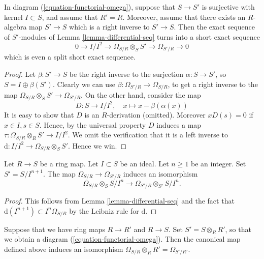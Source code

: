 \begin{lemma}
\label{lemma-differential-seq-split}
In diagram (\ref{equation-functorial-omega}),
suppose that $S \to S'$ is surjective with kernel $I \subset S$,
and assume that $R' = R$. Moreover, assume that there exists
an $R$-algebra map $S' \to S$ which is a right inverse to
$S' \to S$. Then the exact sequence of $S'$-modules
of Lemma \ref{lemma-differential-seq} turns into a short exact sequence
$$
0 \longrightarrow
I/I^2
\longrightarrow
\Omega_{S/R}\otimes_S S'
\longrightarrow
\Omega_{S'/R}
\longrightarrow
0
$$
which is even a split short exact sequence.
\end{lemma}

\begin{proof}
Let $\beta : S' \to S$ be the right inverse to the surjection
$\alpha : S \to S'$, so $S = I \oplus \beta(S')$.
Clearly we can use $\beta : \Omega_{S'/R} \to \Omega_{S/R}$,
to get a right inverse to the map $\Omega_{S/R}\otimes_S S' \to \Omega_{S'/R}$.
On the other hand, consider the map
$$
D : S \longrightarrow I/I^2,
\quad
x \longmapsto x - \beta(\alpha(x))
$$
It is easy to show that $D$ is an $R$-derivation (omitted).
Moreover $x D(s) = 0$ if $x \in I, s \in S$. Hence, by the universal property
$D$ induces a map $\tau : \Omega_{S/R} \otimes_R S' \to I/I^2$.
We omit the verification that it is a left inverse to
$\text{d} : I/I^2  \to \Omega_{S/R}\otimes_S S'$. Hence we win.
\end{proof}

\begin{lemma}
\label{lemma-differential-mod-power-ideal}
Let $R \to S$ be a ring map. Let $I \subset S$ be an ideal.
Let $n \geq 1$ be an integer. Set $S' = S/I^{n + 1}$.
The map $\Omega_{S/R} \to \Omega_{S'/R}$ induces an
isomorphism
$$
\Omega_{S/R} \otimes_S S/I^n
\longrightarrow
\Omega_{S'/R} \otimes_{S'} S/I^n.
$$
\end{lemma}

\begin{proof}
This follows from Lemma \ref{lemma-differential-seq} and the fact that
$\text{d}(I^{n + 1}) \subset I^n\Omega_{S/R}$ by the
Leibniz rule for $\text{d}$.
\end{proof}

\begin{lemma}
\label{lemma-differentials-base-change}
Suppose that we have ring maps $R \to R'$ and $R \to S$.
Set $S' = S\otimes_R R'$, so that we obtain a diagram
(\ref{equation-functorial-omega}). Then the canonical map defined above
induces an isomorphism $\Omega_{S/R} \otimes_R R' = \Omega_{S'/R'}$.
\end{lemma}

